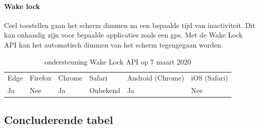 	
	\paragraph{Wake lock }
	Ceel toestellen gaan het scherm dimmen na een bepaalde tijd van inactiviteit. Dit kan onhandig zijn voor bepaalde applicaties zoals een gps. Met de Wake Lock API \autocite{Bogdanovich2017} kan het automatisch dimmen van het scherm tegengegaan worden.
	
	\begin{table}[H]
		\centering
		\begin{tabular}{llllll}
			Edge & Firefox & Chrome & Safari & Android (Chrome) & iOS (Safari) \\
			Ja   & Nee      &  Ja   & Onbekend     & Ja               & Nee          
		\end{tabular}	
		\caption{ondersteuning  Wake Lock API op 7 maart 2020 }
	\end{table}
	
	\subsection{Concluderende tabel}
	
